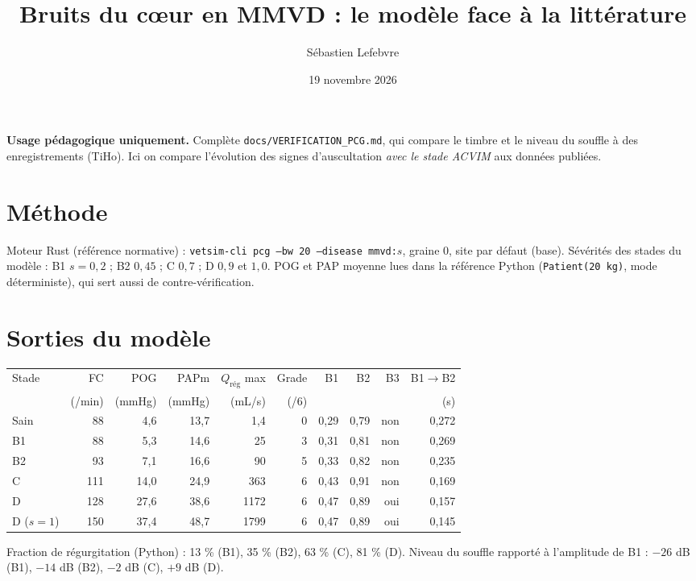 \documentclass[10pt,a4paper]{article}
\title{Bruits du cœur en MMVD : le modèle face à la littérature}
\author{Sébastien Lefebvre}
\date{19 novembre 2026}
\begin{document}
\maketitle
\textbf{Usage pédagogique uniquement.} Complète \texttt{docs/VERIFICATION\_PCG.md}, qui compare le timbre et le niveau du souffle à des enregistrements (TiHo). Ici on compare l'évolution des signes d'auscultation \emph{avec le stade ACVIM} aux données publiées.

\section{Méthode}
Moteur Rust (référence normative) : \texttt{vetsim-cli pcg --bw 20 --disease mmvd:$s$}, graine 0, site par défaut (base). Sévérités des stades du modèle : B1 $s=0{,}2$ ; B2 $0{,}45$ ; C $0{,}7$ ; D $0{,}9$ et $1{,}0$. POG et PAP moyenne lues dans la référence Python (\texttt{Patient(20 kg)}, mode déterministe), qui sert aussi de contre-vérification.

\section{Sorties du modèle}
\begin{center}\small
\begin{tabular}{lrrrrrrrrr}
\toprule
Stade & FC & POG & PAPm & $Q_\text{rég}$ max & Grade & B1 & B2 & B3 & B1$\to$B2 \\
 & (/min) & (mmHg) & (mmHg) & (mL/s) & (/6) & & & & (s)\\
\midrule
Sain & 88 & 4,6 & 13,7 & 1,4 & 0 & 0,29 & 0,79 & non & 0,272\\
B1 & 88 & 5,3 & 14,6 & 25 & 3 & 0,31 & 0,81 & non & 0,269\\
B2 & 93 & 7,1 & 16,6 & 90 & 5 & 0,33 & 0,82 & non & 0,235\\
C & 111 & 14,0 & 24,9 & 363 & 6 & 0,43 & 0,91 & non & 0,169\\
D & 128 & 27,6 & 38,6 & 1172 & 6 & 0,47 & 0,89 & oui & 0,157\\
D ($s=1$) & 150 & 37,4 & 48,7 & 1799 & 6 & 0,47 & 0,89 & oui & 0,145\\
\bottomrule
\end{tabular}
\end{center}
Fraction de régurgitation (Python) : 13 \% (B1), 35 \% (B2), 63 \% (C), 81 \% (D). Niveau du souffle rapporté à l'amplitude de B1 : $-26$ dB (B1), $-14$ dB (B2), $-2$ dB (C), $+9$ dB (D).
\end{document}
